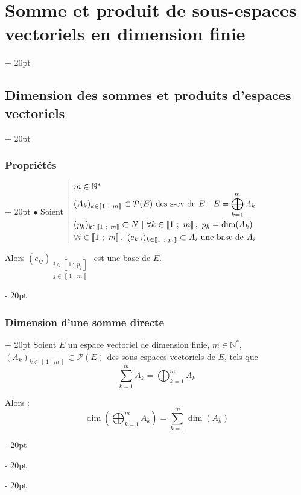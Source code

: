 \documentclass[a4paper, 12pt, twoside]{article}
\newcommand{\N}{\mathbb{N}} %
\newcommand{\nset}[2]{\left\llbracket #1\ ;\ #2 \right\rrbracket}
\newcommand{\lr}[1]{\left( #1 \right)}
\newcommand{\ind}[1][20pt]{\advance\leftskip + #1}
\newcommand{\deind}[1][20pt]{\advance\leftskip - #1}
\newenvironment{indt}[2][20pt]{#2 \par \ind[#1]}{\par \deind} %
\begin{document}
\begin{indt}{\section{Somme et produit de sous-espaces vectoriels en dimension finie}}
\begin{indt}{\subsection{Dimension des sommes et produits d'espaces vectoriels}}
\begin{indt}{\subsubsection{Propriétés}}
                $\bullet$
                Soient
                $
                    \left|
                    \begin{array}{l}
                        m \in \N^*
                        \\
                        (A_k)_{k \in \nset 1 m} \subset \mathcal P(E)\ \text{des s-ev de $E$}\ |\ \displaystyle E = \bigoplus_{k = 1}^m A_k
                        \vspace{3pt}
                        \\
                        (p_k)_{k \in \nset 1 m} \subset N\ |\ \forall k \in \nset 1 m,\ p_k = \dim(A_k)
                        \vspace{3pt}
                        \\
                        \forall i \in \nset 1 m,\ (e_{k,i})_{k \in \nset{1}{p_i}} \subset A_i\ \text{une base de $A_i$}
                    \end{array}
                    \right.
                $
                
                \vspace{12pt}
                
                Alors $(e_{ij})_{\substack{i \in \nset 1 {p_j} \\ j \in \nset 1 m}}$ est une base de $E$.
            \end{indt}
            
            \vspace{12pt}
            
            \begin{indt}{\subsubsection{Dimension d'une somme directe}}
                Soient $E$ un espace vectoriel de dimension finie, $m \in \N^*$, $(A_k)_{k \in \nset 1 m} \subset \mathcal P(E)$ des sous-espaces vectoriels de $E$, tels que
                    \[ \sum_{k = 1}^m A_k = \bigoplus_{k = 1}^m A_k \]
                
                Alors :
                    \[ \dim\!\lr{\bigoplus_{k = 1}^m A_k} = \sum_{k = 1}^m \dim(A_k) \]
            \end{indt}
            

\end{indt}
\end{indt}
\end{document}
